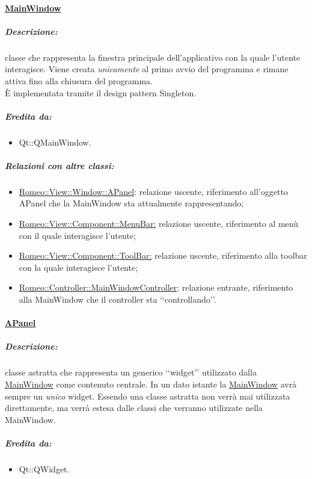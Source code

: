 			\paragraph{\underline{MainWindow}}
			\label{mainview}
				\subparagraph{Descrizione:} classe che rappresenta la finestra principale dell'applicativo \project{} con la quale l'utente interagisce.
				 Viene creata \emph{unicamente} al primo avvio del programma e rimane attiva fino alla chiusura del programma.
				\\È implementata tramite il design pattern\g{} Singleton.
				\subparagraph{Eredita da:}
					\begin{itemize}
					\item Qt::QMainWindow.
					\end{itemize}
				\subparagraph{Relazioni con altre classi:}
					\begin{itemize}
						\item \hyperref[ab_panel]{Romeo::View::Window::APanel}: relazione uscente, riferimento all'oggetto APanel che la MainWindow sta attualmente rappresentando;
						\item \hyperref[mbc]{Romeo::View::Component::MenuBar:} relazione uscente, riferimento al menù con il quale interagisce l'utente;
						\item \hyperref[tb]{Romeo::View::Component::ToolBar:} relazione uscente, riferimento alla toolbar con la quale interagisce l'utente;
						\item \hyperref[controller_main]{Romeo::Controller::MainWindowController}: relazione entrante, riferimento alla MainWindow che il controller sta \lq\lq{}controllando\rq\rq{}.
					\end{itemize}
			
		\paragraph{\underline{APanel}}
		\label{ab_panel}
			\subparagraph{Descrizione:} classe astratta che rappresenta un generico \lq\lq{}widget\rq\rq{} utilizzato dalla \hyperref[mainview]{MainWindow} come contenuto centrale. In un dato istante la \hyperref[mainview]{MainWindow} avrà sempre un \emph{unico} widget. Essendo una classe astratta non verrà mai utilizzata direttamente, ma verrà estesa dalle classi che verranno utilizzate nella MainWindow.
			\subparagraph{Eredita da:}
				\begin{itemize}
				\item Qt::QWidget.
				\end{itemize}
				
